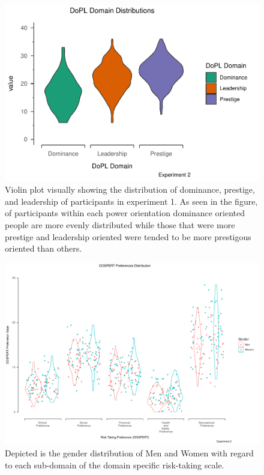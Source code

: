 \documentclass[
  donotrepeattitle,doc, 12pt, a4paper,floatsintext]{apa7}
\begin{document}
\begin{figure}
\centering
\includegraphics{Output_Files/DoPL-Experiment_files/figure-latex/DoPLDomainsExperiment2-1.pdf}
\caption{\label{fig:DoPLDomainsExperiment2}Violin plot visually showing the distribution of dominance, prestige, and leadership of participants in experiment 1. As seen in the figure, of participants within each power orientation dominance oriented people are more evenly distributed while those that were more prestige and leadership oriented were tended to be more prestigous oriented than others.}
\end{figure}

\begin{figure}

{\centering \includegraphics{Output_Files/DoPL-Experiment_files/figure-latex/DOSPERT-Preferences-GenderExperiment2-1} 

}

\caption{Depicted is the gender distribution of Men and Women with regard to each sub-domain of the domain specific risk-taking scale.}\label{fig:DOSPERT-Preferences-GenderExperiment2}
\end{figure}
\end{document}
